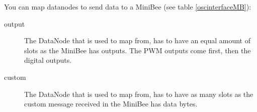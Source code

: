 \documentclass[letterpaper,10pt]{article}
\begin{document}
You can map datanodes to send data to a MiniBee (see table \ref{oscinterfaceMB}):
\begin{description}
 \item [output] The DataNode that is used to map from, has to have an equal amount of slots as the MiniBee has outputs. The PWM outputs come first, then the digital outputs.
 \item [custom] The DataNode that is used to map from, has to have as many slots as the custom message received in the MiniBee has data bytes.
\end{description}

\end{document}
